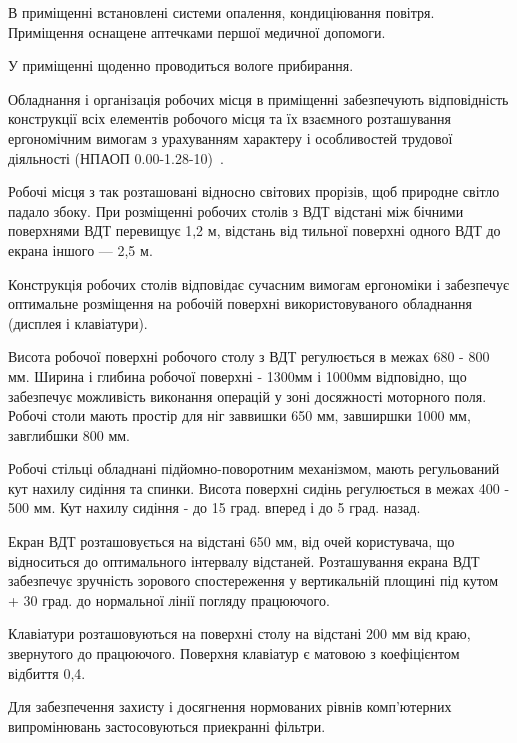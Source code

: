 \documentclass{diploma}
\begin{document}
В приміщенні встановлені системи опалення, кондиціювання повітря. Приміщення оснащене аптечками першої медичної допомоги.

У приміщенні щоденно проводиться вологе прибирання.


Обладнання і організація робочих місця в приміщенні забезпечують відповідність конструкції всіх елементів робочого місця та їх взаємного розташування ергономічним вимогам з урахуванням характеру і особливостей трудової діяльності (НПАОП 0.00-1.28-10)~\cite{oh1}.

Робочі місця з так розташовані відносно світових прорізів, щоб природне світло падало збоку. При розміщенні робочих столів з ВДТ відстані між бічними поверхнями ВДТ перевищує 1,2 м, відстань від тильної поверхні одного ВДТ до екрана іншого --- 2,5 м.

Конструкція робочих столів відповідає сучасним вимогам ергономіки і забезпечує оптимальне розміщення на робочій поверхні використовуваного обладнання (дисплея і клавіатури).

Висота робочої поверхні робочого столу з ВДТ регулюється в межах 680 - 800 мм. Ширина і глибина робочої поверхні - 1300мм і 1000мм відповідно, що забезпечує можливість виконання операцій у зоні досяжності моторного поля.
Робочі столи мають простір для ніг заввишки 650 мм, завширшки 1000 мм, завглибшки 800 мм.

Робочі стільці обладнані підйомно-поворотним механізмом, мають регульований кут нахилу сидіння та спинки. Висота поверхні сидінь регулюється в межах 400 - 500 мм. Кут нахилу сидіння - до 15 град. вперед і до 5 град. назад. 

Екран ВДТ розташовується на відстані 650 мм, від очей користувача, що відноситься до оптимального інтервалу відстаней. Розташування екрана ВДТ забезпечує зручність зорового спостереження у вертикальній площині під кутом + 30 град. до нормальної лінії погляду працюючого.

Клавіатури розташовуються на поверхні столу на відстані 200 мм від краю, звернутого до працюючого. Поверхня клавіатур є матовою з коефіцієнтом відбиття 0,4.

Для забезпечення захисту і досягнення нормованих рівнів комп'ютерних випромінювань застосовуються приекранні фільтри.


\end{document}
